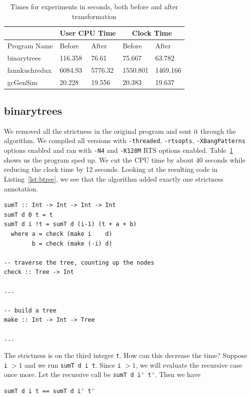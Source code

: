 \documentclass[preprint,nocopyrightspace]{sigplanconf}
\begin{document}
\begin{table}[t]
\label{tab:expr}
\begin{tabular}{| l | l | l | l | l |}
\hline
 & \multicolumn{2}{|c|}{User CPU Time} & \multicolumn{2}{|c|}{Clock Time}\\
\hline
Program Name & Before & After & Before & After\\
\hline
binarytrees & 116.358 & 76.61 & 75.667 & 63.782\\
\hline
fannkuchredux & 6084.93 & 5776.32 & 1550.801 & 1469.166\\
\hline
gcGenSim & 20.228 & 19.556 & 20.383 & 19.637\\
\hline
\end{tabular}
\caption{Times for experiments in seconds, both before and after transformation}
\end{table}
\subsection{binarytrees}
We removed all the strictness in the original program and sent it through the algorithm. We compiled all versions with \lstinline!-threaded!, \lstinline!-rtsopts!, \lstinline!-XBangPatterns! options enabled and ran with \lstinline!-N4! and \lstinline!-K128M! RTS options enabled. Table~\ref{tab:expr} shows us the program sped up. We cut the CPU time by about 40 seconds while reducing the clock time by 12 seconds. Looking at the resulting code in Listing~\ref{lst:btree}, we see that the algorithm added exactly one strictness annotation.
\begin{lstlisting}[float,frame=single,caption=Changes in \lstinline!binarytrees! after applying the genetic algorithm,label=lst:btree]
sumT :: Int -> Int -> Int -> Int
sumT d 0 t = t
sumT d i !t = sumT d (i-1) (t + a + b)
  where a = check (make i    d)
        b = check (make (-i) d)

-- traverse the tree, counting up the nodes
check :: Tree -> Int

...

-- build a tree
make :: Int -> Int -> Tree

...
\end{lstlisting}
The strictness is on the third integer \lstinline!t!. How can this decrease the time? Suppose \lstinline!i! $ > 1$ and we run \lstinline!sumT d i t!. Since \lstinline!i! $ > 1$, we will evaluate the recursive case once more. Let the recursive call be \lstinline!sumT d i' t'!. Then we have 
\begin{lstlisting}
sumT d i t == sumT d i' t'
\end{lstlisting}
\end{document}
